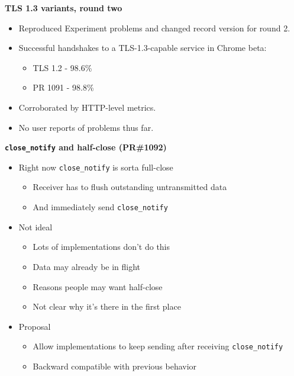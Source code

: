 \documentclass[helvetica]{seminar}
\newcommand{\heading}[1]{%
  \begin{center} 
    \large\bf 
    #1 
  \end{center} 
  \vspace{.4 in}}
\begin{document}
\begin{slide}
\heading{TLS 1.3 variants, round two}

\begin{itemize}
\item Reproduced Experiment problems and changed record version for round 2.
\item Successful handshakes to a TLS-1.3-capable service in Chrome beta:
  \begin{itemize}
  \item TLS 1.2 - 98.6\%
  \item PR 1091 - 98.8\%
  \end{itemize}
\item Corroborated by HTTP-level metrics.

\item No user reports of problems thus far.
\end{itemize}
\end{slide}


\begin{slide}
\heading{\texttt{close\_notify} and half-close (PR\#1092)}

\vspace{-3ex}

\begin{itemize}
\item Right now \verb^close_notify^ is sorta full-close
  \begin{itemize}
  \item Receiver has to flush outstanding untransmitted data
  \item And immediately send \verb^close_notify^
  \end{itemize}

\item Not ideal
  \begin{itemize}
  \item Lots of implementations don't do this
  \item Data may already be in flight
  \item Reasons people may want half-close
  \item Not clear why it's there in the first place

  \end{itemize}

\item Proposal
  \begin{itemize}
  \item Allow implementations to keep sending after receiving \verb^close_notify^
  \item Backward compatible with previous behavior
  \end{itemize}
\end{itemize}
\end{slide}
\end{document}

